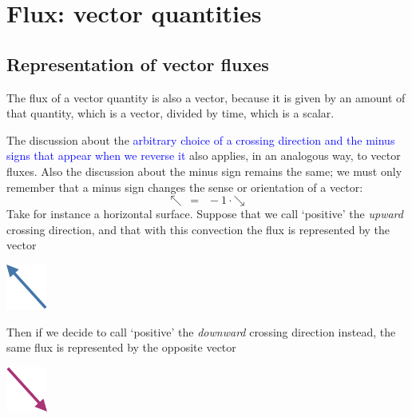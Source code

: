 \documentclass[a4paper,12pt,%
onecolumn,oneside,titlepage,%
british%
]{memoir}
\renewcommand*{\|}[1][]{\nonscript\:#1\vert\nonscript\:\mathopen{}}
\newcommand*{\sect}{\S}%
\renewcommand*{\autoref}[2]{\sidepar{\vspace{-1ex}\footnotesize{\color{blue}\faIcon{%
angle-right%
}\enspace\sect\,\ref{#1} page\,\pageref{#1}}}\textcolor{blue}{#2}}
\begin{document}
\section{Flux: vector quantities}
\label{sec:intuition_fluxes_vector}

\subsection{Representation of vector fluxes}
\label{sec:flux_vector_direction}

The flux of a vector quantity is also a vector, because it is given by an amount of that quantity, which is a vector, divided by time, which is a scalar.

The discussion about the \autoref{sec:flux_scalar_direction}{arbitrary choice of a crossing direction and the minus signs that appear when we reverse it} also applies, in an analogous way, to vector fluxes. Also the discussion about the minus sign remains the same; we must only remember that a minus sign changes the sense or orientation of a vector:
\begin{equation*}
  \mathord{\nwarrow} \mathrel{\enspace=\enspace} -1\cdot\mathord{\searrow}
\end{equation*}
Take for instance a horizontal surface. Suppose that we call \enquote*{positive} the \emph{upward} crossing direction, and that with this convection the flux is represented by the vector
\begin{center}
  \includegraphics[height=4em]{images/vec_NW.pdf}
\end{center}
Then if we decide to call \enquote*{positive} the \emph{downward} crossing direction instead, the same flux is represented by the opposite vector
\begin{center}
  \includegraphics[height=4em]{images/vec_SE.pdf}
\end{center}
\end{document}
